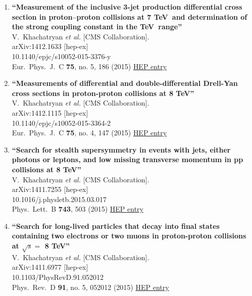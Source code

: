 \documentclass{article}
\begin{document}
\begin{enumerate}
\item%
{\bf ``Measurement of the inclusive 3-jet production differential cross section in proton–proton collisions at 7 TeV and determination of the strong coupling constant in the TeV range''}
  \\{}V.~Khachatryan {\it et al.} [CMS Collaboration].
  \\{}arXiv:1412.1633 [hep-ex]
    \\{}10.1140/epjc/s10052-015-3376-y
\\{}Eur.\ Phys.\ J.\ C {\bf 75}, no. 5, 186 (2015) %
\href{http://inspirehep.net/record/1332746}{HEP entry}


\item%
{\bf ``Measurements of differential and double-differential Drell-Yan cross sections in proton-proton collisions at 8 TeV''}
  \\{}V.~Khachatryan {\it et al.} [CMS Collaboration].
  \\{}arXiv:1412.1115 [hep-ex]
    \\{}10.1140/epjc/s10052-015-3364-2
\\{}Eur.\ Phys.\ J.\ C {\bf 75}, no. 4, 147 (2015) %
\href{http://inspirehep.net/record/1332509}{HEP entry}


\item%
{\bf ``Search for stealth supersymmetry in events with jets, either photons or leptons, and low missing transverse momentum in pp collisions at 8 TeV''}
  \\{}V.~Khachatryan {\it et al.} [CMS Collaboration].
  \\{}arXiv:1411.7255 [hep-ex]
    \\{}10.1016/j.physletb.2015.03.017
\\{}Phys.\ Lett.\ B {\bf 743}, 503 (2015) %
\href{http://inspirehep.net/record/1330294}{HEP entry}


\item%
{\bf ``Search for long-lived particles that decay into final states containing two electrons or two muons in proton-proton collisions at $\sqrt{s} =$ 8 TeV''}
  \\{}V.~Khachatryan {\it et al.} [CMS Collaboration].
  \\{}arXiv:1411.6977 [hep-ex]
    \\{}10.1103/PhysRevD.91.052012
\\{}Phys.\ Rev.\ D {\bf 91}, no. 5, 052012 (2015) %
\href{http://inspirehep.net/record/1329959}{HEP entry}



\end{enumerate}
\end{document}
